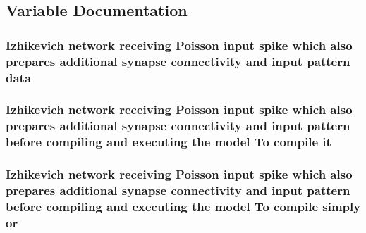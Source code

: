 \subsection{Variable Documentation}
\hypertarget{userproject_2PoissonIzh__project_2README_8txt_a5b1aa829e09a57ee007227ad5ed62a3c}{
\subsubsection[{data}]{\setlength{\rightskip}{0pt plus 5cm}Izhikevich {\bf network} receiving Poisson input spike which also prepares additional synapse connectivity and input pattern data}}\label{userproject_2PoissonIzh__project_2README_8txt_a5b1aa829e09a57ee007227ad5ed62a3c}
\hypertarget{userproject_2PoissonIzh__project_2README_8txt_a3e3bbb6c9b14c38757cf273a117e43e8}{
\subsubsection[{it}]{\setlength{\rightskip}{0pt plus 5cm}Izhikevich {\bf network} receiving Poisson input spike which also prepares additional synapse connectivity and input pattern before compiling and executing the {\bf model} To compile it}}\label{userproject_2PoissonIzh__project_2README_8txt_a3e3bbb6c9b14c38757cf273a117e43e8}
\hypertarget{userproject_2PoissonIzh__project_2README_8txt_ad4021097ab0ba066271614bf3f4c2e27}{
\subsubsection[{or}]{\setlength{\rightskip}{0pt plus 5cm}Izhikevich {\bf network} receiving Poisson input spike which also prepares additional synapse connectivity and input pattern before compiling and executing the {\bf model} To compile simply or}}\label{userproject_2PoissonIzh__project_2README_8txt_ad4021097ab0ba066271614bf3f4c2e27}
